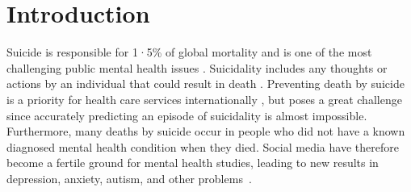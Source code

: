 \vspace{-8mm}
\section{Introduction}
Suicide is responsible for 1·5\% of global mortality and is one of the most challenging public mental health 
issues \cite{oconnor_psychology_2014}.
Suicidality includes any thoughts or actions by an individual that could %
result in death \cite{turecki_suicide_2016}. 
Preventing death by suicide is a priority for health care services internationally \cite{zalsman_suicide_2016}, but poses a great challenge since accurately predicting an episode of suicidality is almost impossible\cite{mchugh2019,velupillai_risk_2019}. Furthermore, many deaths by suicide occur in people who did not have a known diagnosed mental health condition when they died\cite{stone_vital_2018}.  Social media have therefore become a fertile ground for mental health studies, leading to new results in %
depression, anxiety, autism, and other problems~\cite{de2014mental,park2018examining,shen2017detecting,park2017longitudinal,DeChoudhury2016,DeChoudhury2014}.
 
